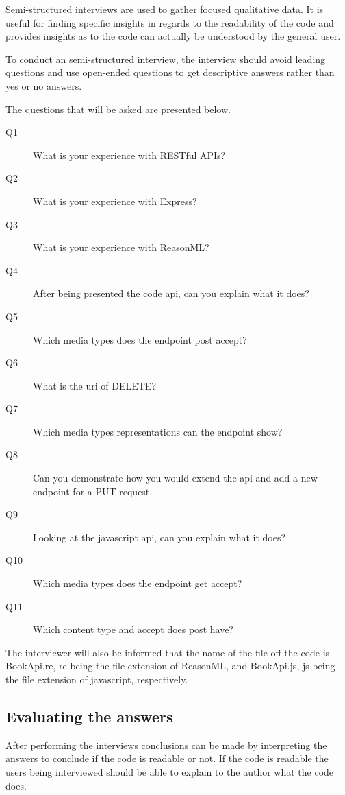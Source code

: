Semi-structured interviews are used to gather focused qualitative data. It is
useful for finding specific insights in regards to the readability of the code
and provides insights as to the code can actually be understood by the general
user.

To conduct an semi-structured interview, the interview should avoid leading
questions and use open-ended questions to get descriptive answers rather than
yes or no answers. 

The questions that will be asked are presented below.

\begin{description}
    \item[Q1] What is your experience with RESTful APIs?
    \item[Q2] What is your experience with Express?
    \item[Q3] What is your experience with ReasonML?
    \item[Q4] After being presented the code api, can you explain what it does?
    \item[Q5] Which media types does the endpoint post accept?
    \item[Q6] What is the uri of DELETE?
    \item[Q7] Which media types representations can the endpoint show?
    \item[Q8] Can you demonstrate how you would extend the api and add a new endpoint
    for a PUT request.
    \item[Q9] Looking at the javascript api, can you explain what it does?
    \item[Q10] Which media types does the endpoint get accept?
    \item[Q11] Which content type and accept does post have?
\end{description}

The interviewer will also be informed that the name of the file off the code is
BookApi.re, re being the file extension of ReasonML, and BookApi.js, js being
the file extension of javascript, respectively. 

\subsection{Evaluating the answers}

After performing the interviews conclusions can be made by interpreting the
answers to conclude if the code is readable or not. If the code is readable the
users being interviewed should be able to explain to the author what the code
does.

